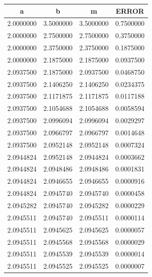 \documentclass[12pt,a4paper]{article}
\begin{document}
\begin{tabular}{| c | c | c | c |}
\hline
a & b & m & ERROR \\ \hline
 2.0000000   &    3.5000000   &    3.5000000   &    0.7500000      \\
 2.0000000   &    2.7500000   &    2.7500000   &    0.3750000      \\
 2.0000000   &    2.3750000   &    2.3750000   &    0.1875000      \\
 2.0000000   &    2.1875000   &    2.1875000   &    0.0937500      \\
 2.0937500   &    2.1875000   &    2.0937500   &    0.0468750      \\
 2.0937500   &    2.1406250   &    2.1406250   &    0.0234375      \\
 2.0937500   &    2.1171875   &    2.1171875   &    0.0117188      \\
 2.0937500   &    2.1054688   &    2.1054688   &    0.0058594      \\
 2.0937500   &    2.0996094   &    2.0996094   &    0.0029297      \\
 2.0937500   &    2.0966797   &    2.0966797   &    0.0014648      \\
 2.0937500   &    2.0952148   &    2.0952148   &    0.0007324      \\
 2.0944824   &    2.0952148   &    2.0944824   &    0.0003662      \\
 2.0944824   &    2.0948486   &    2.0948486   &    0.0001831      \\
 2.0944824   &    2.0946655   &    2.0946655   &    0.0000916      \\
 2.0944824   &    2.0945740   &    2.0945740   &    0.0000458      \\
 2.0945282   &    2.0945740   &    2.0945282   &    0.0000229		\\
 2.0945511   &    2.0945740   &    2.0945511   &    0.0000114      \\
 2.0945511   &    2.0945625   &    2.0945625   &    0.0000057      \\
 2.0945511   &    2.0945568   &    2.0945568   &    0.0000029      \\
 2.0945511   &    2.0945539   &    2.0945539   &    0.0000014      \\
 2.0945511   &    2.0945525   &    2.0945525   &    0.0000007   \\  \hline
\end{tabular}



\end{document}
